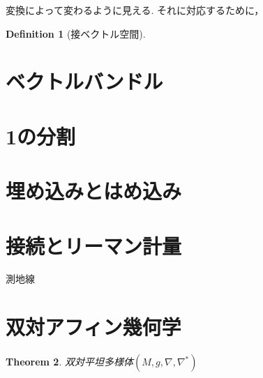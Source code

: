 \documentclass{ujarticle}
\newtheorem{thm}{Theorem}[section]
\newtheorem{dfn}[thm]{Definition}
\begin{document}
変換によって変わるように見える.
それに対応するために，

\begin{dfn}[接ベクトル空間]

\end{dfn}

\section{ベクトルバンドル}
\label{sec:ベクトルバンドル}

\section{1の分割}
\label{sec:1の分割}

\section{埋め込みとはめ込み}
\label{sec:埋め込みとはめ込み}


\section{接続とリーマン計量}
\label{sec:接続とリーマン計量}

測地線

\section{双対アフィン幾何学}
\label{sec:双対アフィン幾何学}

\begin{thm}
 双対平坦多様体$(M,g,\nabla,\nabla^{*} )$
\end{thm}
\end{document}
